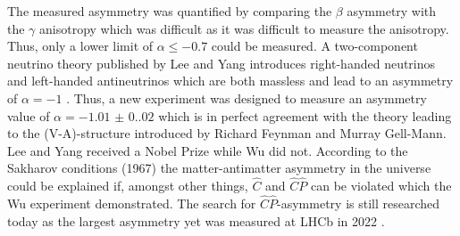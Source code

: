 The measured asymmetry was quantified by comparing the $\beta$ asymmetry with the $\gamma$ anisotropy which was difficult as it was difficult to measure the anisotropy.
Thus, only a lower limit of $\alpha\leq -0.7$ could be measured.
A two-component neutrino theory published by Lee and Yang introduces right-handed neutrinos and left-handed antineutrinos which are both massless and lead to an asymmetry of $\alpha=-1$ \cite{PhysRev.105.1671}.
Thus, a new experiment was designed to measure an asymmetry value of $\alpha=\num{-1.01(0.02)}$ which is in perfect agreement with the theory leading to the (V-A)-structure introduced by Richard Feynman and Murray Gell-Mann.
Lee and Yang received a Nobel Prize while Wu did not.
According to the Sakharov conditions (1967) \cite{Gato-Rivera} the matter-antimatter asymmetry in the universe could be explained if, amongst other things, $\hat C$ and $\hat C\hat P$ can be violated which the Wu experiment demonstrated.
The search for $\hat C\hat P$-asymmetry is still researched today as the largest asymmetry yet was measured at LHCb in 2022 \cite{AntiSymmetryLHC}.



